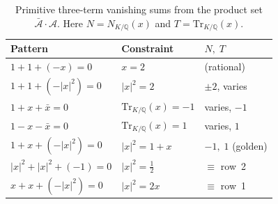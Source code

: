 \documentclass[12pt,a4paper]{article}
\newcommand{\Q}{\mathbb{Q}}
\newcommand{\Norm}[1]{N_{K/\Q}\!\left(#1\right)}
\newcommand{\Tr}[1]{\mathrm{Tr}_{K/\Q}\!\left(#1\right)}
\begin{document}
\begin{table}[h]
\centering
\caption{Primitive three-term vanishing sums from the product set
$\bar{\mathcal{A}} \cdot \mathcal{A}$.  Here
$N = \Norm{x}$ and $T = \Tr{x}$.}\label{tab:vanishing}
\begin{tabular}{@{}lll@{}}
\toprule
Pattern & Constraint & $N,\; T$ \\
\midrule
$1 + 1 + (-x) = 0$ & $x = 2$ & (rational) \\
$1 + 1 + (-|x|^2) = 0$ & $|x|^2 = 2$ & $\pm 2$, varies \\
$1 + x + \bar{x} = 0$ & $\Tr{x} = -1$ & varies,\; ${-1}$ \\
$1 - x - \bar{x} = 0$ & $\Tr{x} = 1$ & varies,\; $1$ \\
$1 + x + (-|x|^2) = 0$ & $|x|^2 = 1 + x$ & ${-1},\; 1$ (golden) \\
$|x|^2 + |x|^2 + (-1) = 0$ & $|x|^2 = \tfrac{1}{2}$ & $\equiv$ row~2 \\
$x + x + (-|x|^2) = 0$ & $|x|^2 = 2x$ & $\equiv$ row~1 \\
\bottomrule
\end{tabular}
\end{table}
\end{document}
